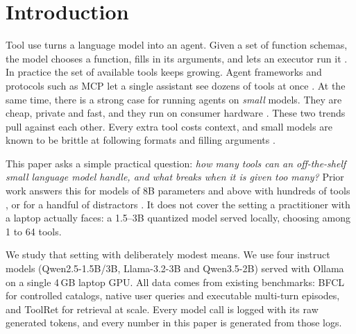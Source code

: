\section{Introduction}
\label{sec:intro}

Tool use turns a language model into an agent. Given a set of function schemas, the model chooses a function, fills in its arguments, and lets an executor run it \citep{schick2023toolformer, yao2023react, patil2024gorilla}.
In practice the set of available tools keeps growing. Agent frameworks and protocols such as MCP let a single assistant see dozens of tools at once \citep{wang2025mcpbench, luo2025mcpuniverse}.
At the same time, there is a strong case for running agents on \emph{small} models. They are cheap, private and fast, and they run on consumer hardware \citep{belcak2025slmfuture, erdogan2024tinyagent}.
These two trends pull against each other. Every extra tool costs context, and small models are known to be brittle at following formats and filling arguments \citep{kavathekar2025small, mastoi2026beyond}.

This paper asks a simple practical question: \emph{how many tools can an off-the-shelf small language model handle, and what breaks when it is given too many?}
Prior work answers this for models of 8B parameters and above with hundreds of tools \citep{kate2025longfunceval}, or for a handful of distractors \citep{rabinovich2025robustness}. It does not cover the setting a practitioner with a laptop actually faces: a 1.5--3B quantized model served locally, choosing among 1 to 64 tools.

We study that setting with deliberately modest means. We use four instruct models (Qwen2.5-1.5B/3B, Llama-3.2-3B and Qwen3.5-2B) served with Ollama on a single 4\,GB laptop GPU. All data comes from existing benchmarks: BFCL \citep{patil2025bfcl} for controlled catalogs, native user queries and executable multi-turn episodes, and ToolRet \citep{shi2025toolret} for retrieval at scale.
Every model call is logged with its raw generated tokens, and every number in this paper is generated from those logs.

